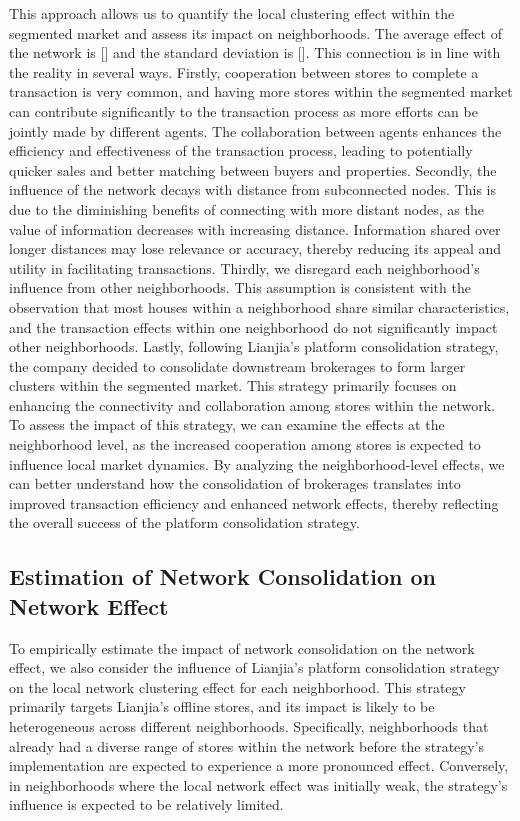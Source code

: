 \documentclass[11pt]{article}
\begin{document}
This approach allows us to quantify the local clustering effect within the segmented market and assess its impact on neighborhoods. The average effect of the network is [] and the standard deviation is []. This connection is in line with the reality in several ways. Firstly, cooperation between stores to complete a transaction is very common, and having more stores within the segmented market can contribute significantly to the transaction process as more efforts can be jointly made by different agents. The collaboration between agents enhances the efficiency and effectiveness of the transaction process, leading to potentially quicker sales and better matching between buyers and properties. Secondly, the influence of the network decays with distance from subconnected nodes. This is due to the diminishing benefits of connecting with more distant nodes, as the value of information decreases with increasing distance. Information shared over longer distances may lose relevance or accuracy, thereby reducing its appeal and utility in facilitating transactions. Thirdly, we disregard each neighborhood's influence from other neighborhoods. This assumption is consistent with the observation that most houses within a neighborhood share similar characteristics, and the transaction effects within one neighborhood do not significantly impact other neighborhoods. Lastly, following Lianjia's platform consolidation strategy, the company decided to consolidate downstream brokerages to form larger clusters within the segmented market. This strategy primarily focuses on enhancing the connectivity and collaboration among stores within the network. To assess the impact of this strategy, we can examine the effects at the neighborhood level, as the increased cooperation among stores is expected to influence local market dynamics. By analyzing the neighborhood-level effects, we can better understand how the consolidation of brokerages translates into improved transaction efficiency and enhanced network effects, thereby reflecting the overall success of the platform consolidation strategy.

\subsection{Estimation of Network Consolidation on Network Effect} \label{subsec:platform_network_effect}

To empirically estimate the impact of network consolidation on the network effect, we also consider the influence of Lianjia's platform consolidation strategy on the local network clustering effect for each neighborhood. This strategy primarily targets Lianjia's offline stores, and its impact is likely to be heterogeneous across different neighborhoods. Specifically, neighborhoods that already had a diverse range of stores within the network before the strategy's implementation are expected to experience a more pronounced effect. Conversely, in neighborhoods where the local network effect was initially weak, the strategy's influence is expected to be relatively limited.
\end{document}
